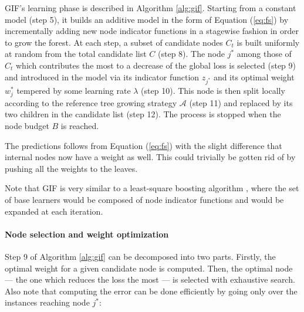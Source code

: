 \documentclass{article}
\begin{document}

GIF's learning phase is described in Algorithm \ref{alg:gif}.
Starting from a constant model (step 5), it builds an additive model in the 
form of Equation (\ref{eq:fs}) by incrementally adding new node indicator 
functions in a stagewise fashion in order to grow the forest.
At each step, a subset of candidate nodes $C_t$ is built uniformly at random 
from the total candidate list $C$ (step 8). The node $j^*$ among those of $C_t$ 
which contributes the most to a decrease of the global loss is selected (step 
9) and introduced in the model via its indicator function $z_{j^*}$ and its 
optimal weight $w^*_j$ tempered by some learning rate $\lambda$ (step 10). This 
node is then split locally according to the reference tree growing strategy 
$\mathcal{A}$ (step 11) and replaced by its two children in the candidate list 
(step 12). The process is stopped when the node budget $B$ is reached. 

The predictions follows from Equation (\ref{eq:fs}) with the slight difference 
that 
internal nodes now have a weight as well. This could trivially be gotten rid of 
by pushing all the weights to the leaves.


Note that GIF is very similar to a least-square boosting algorithm
\cite{hastie2009}, where the set of base learners would be composed of
node indicator functions and would be expanded at each iteration.

\paragraph{Node selection and weight optimization}
Step 9 of Algorithm \ref{alg:gif} can be decomposed into two parts. Firstly, 
the optimal weight for a given candidate node is computed. Then, the optimal 
node --- the one which reduces the loss the most --- is selected with 
exhaustive search. Also note that computing the error can be done efficiently 
by going only over the instances reaching node $j^*$:
\end{document}
